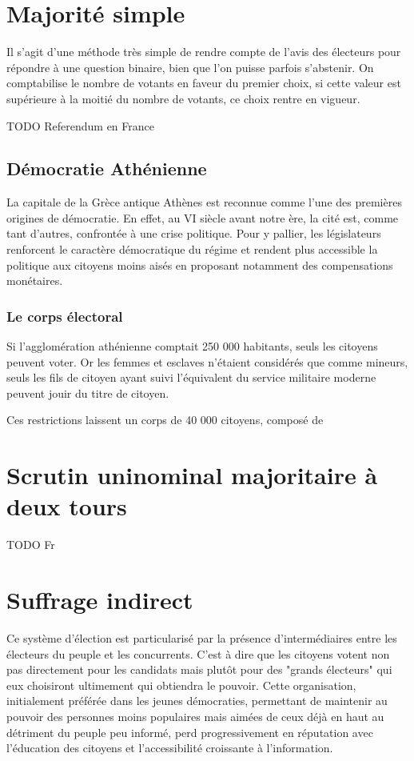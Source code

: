 \documentclass[11pt,a4paper]{report}
\begin{document}
\nocite{wiki:histdemo}
\chapter{Majorité simple}
Il s'agit d'une méthode très simple de rendre compte de l'avis des électeurs pour répondre à une question binaire, bien que l'on puisse parfois s'abstenir.
On comptabilise le nombre de votants en faveur du premier choix, si cette valeur est supérieure à la moitié du nombre de votants, ce choix rentre en vigueur.


TODO Referendum en France
\section{Démocratie Athénienne}
La capitale de la Grèce antique Athènes est reconnue comme l'une des premières origines de démocratie. 
En effet, au VI siècle avant notre ère, la cité est, comme tant d'autres, confrontée à une crise politique. 
Pour y pallier, les législateurs renforcent le caractère démocratique du régime et rendent plus accessible la politique aux citoyens moins aisés en proposant notamment des compensations monétaires.

\subsection{Le corps électoral}
Si l'agglomération athénienne comptait 250 000 habitants\nocite{persee:popu}, seuls les citoyens peuvent voter. 
Or les femmes et esclaves n'étaient considérés que comme mineurs, seuls les fils de citoyen ayant suivi l'équivalent du service militaire moderne peuvent jouir du titre de citoyen.
 
Ces restrictions laissent un corps de 40 000 citoyens, composé de 


\chapter{Scrutin uninominal majoritaire à deux tours}
TODO Fr

\chapter{Suffrage indirect}
Ce système d'élection est particularisé par la présence d'intermédiaires entre les électeurs du peuple et les concurrents. 
C'est à dire que les citoyens votent non pas directement pour les candidats mais plutôt pour des "grands électeurs" qui eux choisiront ultimement qui obtiendra le pouvoir.
Cette organisation, initialement préférée dans les jeunes démocraties, permettant de maintenir au pouvoir des personnes moins populaires mais aimées de ceux déjà en haut au détriment du peuple peu informé, perd progressivement en réputation avec l'éducation des citoyens et l'accessibilité croissante à l'information.
\nocite{wiki:scrutinindir}
\end{document}
